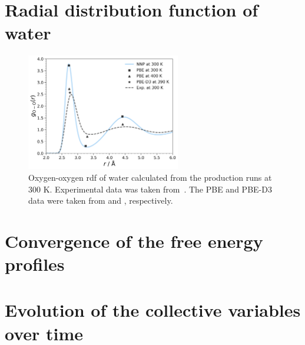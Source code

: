 \clearpage
\section{Radial distribution function of water}

\begin{figure}[ht]
    \centering
    \includegraphics[width=0.6\textwidth]{Figures/4_Results/results_water_rdf.png}
    \caption{Oxygen-oxygen \ac{rdf} of water calculated from the production runs at 300 K. Experimental data was taken from~\citep{soperRadialDistributionFunctions2013}. The PBE and PBE-D3 data were taken from \citep{phamStructureDynamicsAqueous2016} and \citep{zhouQuantifyingStructureWater2022}, respectively.}
    \label{fig:water_rdf}
\end{figure}

\clearpage
\section{Convergence of the free energy profiles}




\clearpage
\section{Evolution of the collective variables over time}




